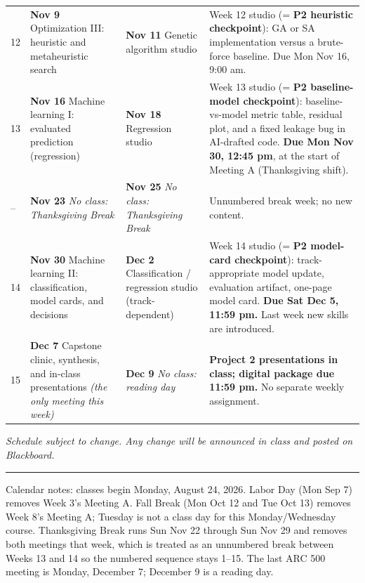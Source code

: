 \documentclass[11pt]{article}
\begin{document}
\begin{longtable}{@{}K J J Q@{}}
12 & \textbf{Nov 9} \newline Optimization III: heuristic and metaheuristic search
  & \textbf{Nov 11} \newline Genetic algorithm studio
  & Week 12 studio (= \textbf{P2 heuristic checkpoint}): GA or SA implementation versus a
    brute-force baseline. Due Mon Nov 16, 9:00 am. \\

13 & \textbf{Nov 16} \newline Machine learning I: evaluated prediction (regression)
  & \textbf{Nov 18} \newline Regression studio
  & Week 13 studio (= \textbf{P2 baseline-model checkpoint}): baseline-vs-model metric
    table, residual plot, and a fixed leakage bug in AI-drafted code.
    \textbf{Due Mon Nov 30, 12:45 pm}, at the start of Meeting A (Thanksgiving shift). \\

-- & \textbf{Nov 23} \newline \textit{No class: Thanksgiving Break}
  & \textbf{Nov 25} \newline \textit{No class: Thanksgiving Break}
  & Unnumbered break week; no new content. \\

14 & \textbf{Nov 30} \newline Machine learning II: classification, model cards, and
     decisions
  & \textbf{Dec 2} \newline Classification / regression studio (track-dependent)
  & Week 14 studio (= \textbf{P2 model-card checkpoint}): track-appropriate model update,
    evaluation artifact, one-page model card. \textbf{Due Sat Dec 5, 11:59 pm.} Last week
    new skills are introduced. \\

15 & \textbf{Dec 7} \newline Capstone clinic, synthesis, and in-class presentations
     \textit{(the only meeting this week)}
  & \textbf{Dec 9} \newline \textit{No class: reading day}
  & \textbf{Project 2 presentations in class; digital package due 11:59 pm.} No separate
    weekly assignment. \\

\end{longtable}

\vspace{2pt}
{\footnotesize\itshape * Schedule subject to change. Any change will be announced in class and
posted on Blackboard.}

\vspace{10pt}
{\color{rulegray}\hrule height 0.4pt}
\vspace{4pt}
{\footnotesize\RaggedRight Calendar notes: classes begin Monday, August 24, 2026. Labor Day (Mon Sep 7)
removes Week 3's Meeting A. Fall Break (Mon Oct 12 and Tue Oct 13) removes Week 8's Meeting A;
Tuesday is not a class day for this Monday/Wednesday course. Thanksgiving Break runs Sun Nov
22 through Sun Nov 29 and removes both meetings that week, which is treated as an unnumbered
break between Weeks 13 and 14 so the numbered sequence stays 1--15. The last ARC 500 meeting
is Monday, December 7; December 9 is a reading day.\par}
\end{document}
